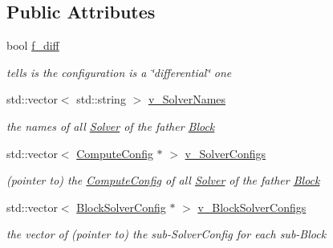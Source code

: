 \subsection*{Public Attributes}
\begin{DoxyCompactItemize}
\item 
\mbox{\label{class_s_m_spp__di__unipi__it_1_1_block_solver_config_af320d149581e7a57ddf42fcdc1c1753c}} 
bool \mbox{\hyperlink{class_s_m_spp__di__unipi__it_1_1_block_solver_config_af320d149581e7a57ddf42fcdc1c1753c}{f\+\_\+diff}}
\begin{DoxyCompactList}\small\item\em tells is the configuration is a \char`\"{}differential\char`\"{} one \end{DoxyCompactList}\item 
\mbox{\label{class_s_m_spp__di__unipi__it_1_1_block_solver_config_abbd325a83299ba6b5a36a67041b171db}} 
std\+::vector$<$ std\+::string $>$ \mbox{\hyperlink{class_s_m_spp__di__unipi__it_1_1_block_solver_config_abbd325a83299ba6b5a36a67041b171db}{v\+\_\+\+Solver\+Names}}
\begin{DoxyCompactList}\small\item\em the names of all \mbox{\hyperlink{class_s_m_spp__di__unipi__it_1_1_solver}{Solver}} of the father \mbox{\hyperlink{class_s_m_spp__di__unipi__it_1_1_block}{Block}} \end{DoxyCompactList}\item 
\mbox{\label{class_s_m_spp__di__unipi__it_1_1_block_solver_config_aea9c3e566efc407f0f22f466192bd510}} 
std\+::vector$<$ \mbox{\hyperlink{class_s_m_spp__di__unipi__it_1_1_compute_config}{Compute\+Config}} $\ast$ $>$ \mbox{\hyperlink{class_s_m_spp__di__unipi__it_1_1_block_solver_config_aea9c3e566efc407f0f22f466192bd510}{v\+\_\+\+Solver\+Configs}}
\begin{DoxyCompactList}\small\item\em (pointer to) the \mbox{\hyperlink{class_s_m_spp__di__unipi__it_1_1_compute_config}{Compute\+Config}} of all \mbox{\hyperlink{class_s_m_spp__di__unipi__it_1_1_solver}{Solver}} of the father \mbox{\hyperlink{class_s_m_spp__di__unipi__it_1_1_block}{Block}} \end{DoxyCompactList}\item 
\mbox{\label{class_s_m_spp__di__unipi__it_1_1_block_solver_config_aa5e5a79b0dba2bcb50a76b902f89fbb4}} 
std\+::vector$<$ \mbox{\hyperlink{class_s_m_spp__di__unipi__it_1_1_block_solver_config}{Block\+Solver\+Config}} $\ast$ $>$ \mbox{\hyperlink{class_s_m_spp__di__unipi__it_1_1_block_solver_config_aa5e5a79b0dba2bcb50a76b902f89fbb4}{v\+\_\+\+Block\+Solver\+Configs}}
\begin{DoxyCompactList}\small\item\em the vector of (pointer to) the sub-\/\+Solver\+Config for each sub-\/\+Block \end{DoxyCompactList}\end{DoxyCompactItemize}
